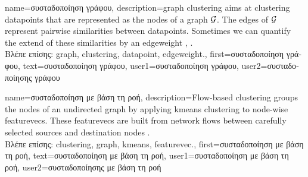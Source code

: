 
{name={\foreignlanguage{greek}{συσταδοποίηση γράφου}},
	description={\Gls{graph} \gls{clustering} aims at 
		\gls{clustering} \gls{datapoint}s that are represented as the nodes 
		of a \gls{graph} $\mathcal{G}$. The edges of $\mathcal{G}$ represent 
		pairwise similarities between \gls{datapoint}s. Sometimes we
		can quantify the extend of these similarities by an \gls{edgeweight} \cite{FlowSpecClustering2021}, \cite{Luxburg2007}.\\
		\foreignlanguage{greek}{Βλέπε επίσης:} \gls{graph}, \gls{clustering}, \gls{datapoint}, \gls{edgeweight}.}, 
	first={\foreignlanguage{greek}{συσταδοποίηση γράφου}},
	text={\foreignlanguage{greek}{συσταδοποίηση γράφου}},
	user1={\foreignlanguage{greek}{συσταδοποίηση γράφου}}, %
    	user2={\foreignlanguage{greek}{συσταδοποίησης γράφου}} %
}

{name={\foreignlanguage{greek}{συσταδοποίηση με βάση τη ροή}},
	description={Flow-based \gls{clustering} groups the nodes 
		of an undirected \gls{graph} by applying \gls{kmeans} \gls{clustering} to node-wise 
		\gls{featurevec}s. These \gls{featurevec}s are built from network flows between 
		carefully selected sources and destination nodes \cite{FlowSpecClustering2021}.\\
		\foreignlanguage{greek}{Βλέπε επίσης:} \gls{clustering}, \gls{graph}, \gls{kmeans}, \gls{featurevec}.}, 
	first={\foreignlanguage{greek}{συσταδοποίηση με βάση τη ροή}},
	text={\foreignlanguage{greek}{συσταδοποίηση με βάση τη ροή}},
	user1={\foreignlanguage{greek}{συσταδοποίηση με βάση τη ροή}}, %
    	user2={\foreignlanguage{greek}{συσταδοποίησης με βάση τη ροή}} %
}

